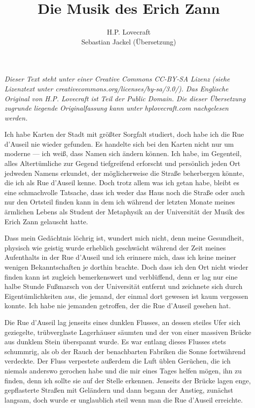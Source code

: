 \documentclass[a4paper]{memoir}
\begin{document}
\title{Die Musik des Erich Zann}
\author{H.P. Lovecraft\\
		Sebastian Jackel (Übersetzung)}
\date{}
\maketitle

\textit{Dieser Text steht unter einer Creative Commons CC-BY-SA Lizenz
(siehe Lizenztext unter creativecommons.org/licenses/by-sa/3.0/). Das Englische Original von H.P. Lovecraft ist Teil der Public Domain. Die dieser Übersetzung zugrunde liegende Originalfassung kann unter hplovecraft.com nachgelesen werden.}

\vspace{12pt}

Ich habe Karten der Stadt mit größter Sorgfalt studiert, doch habe ich die Rue d'Auseil nie wieder gefunden. Es handelte sich bei den Karten nicht nur um moderne --- ich weiß, dass Namen sich ändern können. Ich habe, im Gegenteil, alles Altertümliche zur Gegend tiefgreifend erforscht und persönlich jeden Ort jedweden Namens erkundet, der möglicherweise die Straße beherbergen könnte, die ich als Rue d'Auseil kenne. Doch trotz allem was ich getan habe, bleibt es eine schmachvolle Tatsache, dass ich weder das Haus noch die Straße oder auch nur den Ortsteil finden kann in dem ich während der letzten Monate meines ärmlichen Lebens als Student der Metaphysik an der Universität der Musik des Erich Zann gelauscht hatte.

Dass mein Gedächtnis löchrig ist, wundert mich nicht, denn meine Gesundheit, physisch wie geistig wurde erheblich geschwächt während der Zeit meines Aufenthalts in der Rue d'Auseil und ich erinnere mich, dass ich keine meiner wenigen Bekanntschaften je dorthin brachte. Doch dass ich den Ort nicht wieder finden kann ist zugleich bemerkenswert und verblüffend, denn er lag nur eine halbe Stunde Fußmarsch von der Universität entfernt und zeichnete sich durch Eigentümlichkeiten aus, die jemand, der einmal dort gewesen ist kaum vergessen konnte. Ich habe nie jemanden getroffen, der die Rue d'Auseil gesehen hat.

Die Rue d'Auseil lag jenseits eines dunklen Flusses, an dessen steiles Ufer sich geziegelte, trübverglaste Lagerhäuser säumten und der von einer massiven Brücke aus dunklem Stein überspannt wurde. Es war entlang dieses Flusses stets schummrig, als ob der Rauch der benachbarten Fabriken die Sonne fortwährend verdeckte. Der Fluss verpestete außerdem die Luft üblen Gerüchen, die ich niemals anderswo gerochen habe und die mir eines Tages helfen mögen, ihn zu finden, denn ich sollte sie auf der Stelle erkennen. Jenseits der Brücke lagen enge, gepflasterte Straßen mit Geländern und dann begann der Anstieg, zunächst langsam, doch wurde er unglaublich steil wenn man die Rue d'Auseil erreichte.
\end{document}
